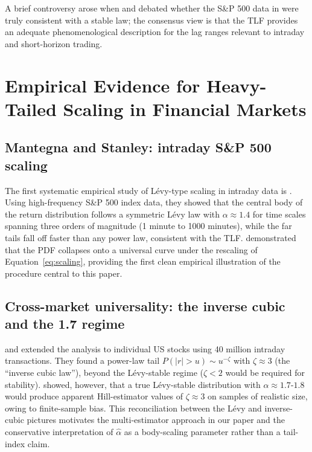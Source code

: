 \documentclass[12pt,a4paper]{article}
\begin{document}
A brief controversy arose when \textcite{CopsonSmith1995} and
\textcite{Mantegna1995reply} debated whether the S\&P 500 data in
\textcite{MantegnaStanley1995} were truly consistent with a stable law;
the consensus view \parencite[Ch.~6]{BouchaudPotters2003} is that the TLF
provides an adequate phenomenological description for the lag ranges relevant to
intraday and short-horizon trading.


\section{Empirical Evidence for Heavy-Tailed Scaling in Financial Markets}
\label{sec:empirical}

\subsection{Mantegna and Stanley: intraday S\&P 500 scaling}

The first systematic empirical study of Lévy-type scaling in intraday data is
\textcite{MantegnaStanley1994,MantegnaStanley1995}. Using high-frequency
S\&P 500 index data, they showed that the central body of the return
distribution follows a symmetric Lévy law with $\alpha \approx 1.4$ for time
scales spanning three orders of magnitude (1 minute to 1000 minutes), while the
far tails fall off faster than any power law, consistent with the TLF.
\textcite{MantegnaStanley1995} demonstrated that the PDF collapses onto a
universal curve under the rescaling of Equation~\eqref{eq:scaling}, providing
the first clean empirical illustration of the procedure central to this paper.

\subsection{Cross-market universality: the inverse cubic and the 1.7 regime}

\textcite{Gopikrishnan1998} and \textcite{Gopikrishnan1999} extended the
analysis to individual US stocks using 40 million intraday transactions. They
found a power-law tail $P(|r| > u) \sim u^{-\zeta}$ with $\zeta \approx 3$
(the ``inverse cubic law''), beyond the Lévy-stable regime ($\zeta < 2$ would
be required for stability). \textcite{Weron2001} showed, however, that a
true Lévy-stable distribution with $\alpha \approx 1.7$-$1.8$ would produce
apparent Hill-estimator values of $\zeta \approx 3$ on samples of realistic
size, owing to finite-sample bias. This reconciliation between the Lévy and
inverse-cubic pictures motivates the multi-estimator approach in our paper and
the conservative interpretation of $\hat\alpha$ as a body-scaling parameter
rather than a tail-index claim.
\end{document}
